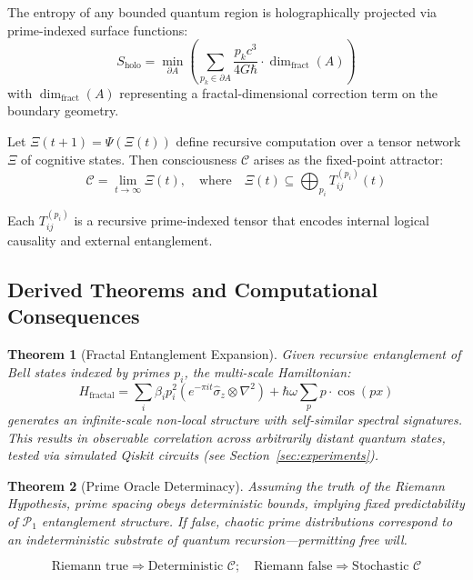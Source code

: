 \documentclass[12]{amsart}
\theoremstyle{plain}
\newtheorem{theorem}{Theorem}[section]
\begin{document}
\begin{axiom}
The entropy of any bounded quantum region is holographically projected via prime-indexed surface functions:
\[
S_{\text{holo}} = \min_{\partial A} \left( \sum_{p_k \in \partial A} \frac{p_k c^3}{4 G \hbar} \cdot \dim_\text{fract}(A) \right)
\]
with $\dim_\text{fract}(A)$ representing a fractal-dimensional correction term on the boundary geometry.
\end{axiom}

\begin{axiom}
Let $\Xi(t+1) = \Psi(\Xi(t))$ define recursive computation over a tensor network $\Xi$ of cognitive states. Then consciousness $\mathcal{C}$ arises as the fixed-point attractor:
\[
\mathcal{C} = \lim_{t \to \infty} \Xi(t), \quad \text{where} \quad \Xi(t) \subseteq \bigoplus_{p_i} T^{(p_i)}_{ij}(t)
\]

Each $T^{(p_i)}_{ij}$ is a recursive prime-indexed tensor that encodes internal logical causality and external entanglement.
\end{axiom}

\subsection{Derived Theorems and Computational Consequences}

\begin{theorem}[Fractal Entanglement Expansion]
Given recursive entanglement of Bell states indexed by primes $p_i$, the multi-scale Hamiltonian:
\[
H_{\text{fractal}} = \sum_{i} \beta_i p_i^2 \left(e^{-\pi i t} \hat{\sigma}_z \otimes \nabla^2\right) + \hbar \omega \sum_{p} p \cdot \cos(p x)
\]
generates an infinite-scale non-local structure with self-similar spectral signatures. This results in observable correlation across arbitrarily distant quantum states, tested via simulated Qiskit circuits (see Section~\ref{sec:experiments}).
\end{theorem}

\begin{theorem}[Prime Oracle Determinacy]
Assuming the truth of the Riemann Hypothesis, prime spacing obeys deterministic bounds, implying fixed predictability of $\mathcal{P}_1$ entanglement structure. If false, chaotic prime distributions correspond to an indeterministic substrate of quantum recursion—permitting free will.

\[
\text{Riemann true} \Rightarrow \text{Deterministic $\mathcal{C}$}; \quad
\text{Riemann false} \Rightarrow \text{Stochastic $\mathcal{C}$}
\]
\end{theorem}
\end{document}
